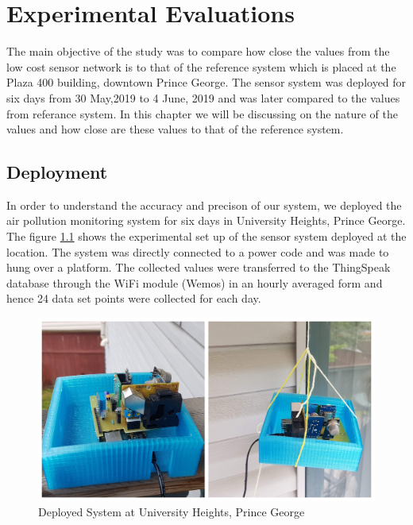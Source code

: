 \chapter{Experimental Evaluations}

The main objective of the study was to compare how close the values from the low cost sensor network is to that of the reference system which is placed at the Plaza 400 building, downtown Prince George. The sensor system was deployed for six days from 30 May,2019 to 4 June, 2019 and was later compared to the values from referance system. In this chapter we will be discussing on the nature of the values and how close are these values to that of the reference system.

\section{Deployment}

In order to understand the accuracy and precison of our system, we deployed the air pollution monitoring system for six days in University Heights, Prince George. The figure \ref{deployed} shows the experimental set up of the sensor system deployed at the location. The system was directly connected to a power code and was made to hung over a platform. The collected values were transferred to the ThingSpeak database through the WiFi module (Wemos) in an hourly averaged form and hence 24 data set points were collected for each day.

\begin{figure}[h]
    \begin{center}
    \includegraphics[scale=0.5]{images/figure20.jpg}
    \end{center}
    \caption{Deployed System at University Heights, Prince George}
    \label{deployed}

  \end{figure} 


